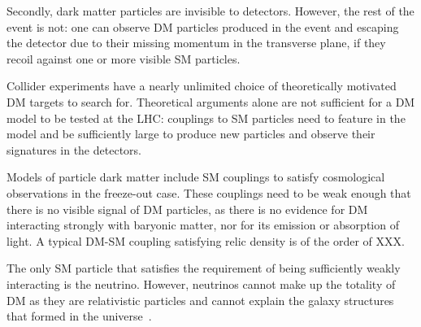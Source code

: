 
Secondly, dark matter particles are invisible to detectors. 
However, the rest of the event is not: one can observe DM particles
produced in the event and escaping the detector 
due to their missing momentum in the transverse plane, if they recoil against one or 
more visible SM particles. 



Collider experiments have a nearly unlimited choice of theoretically
motivated DM targets to search for. 
Theoretical arguments alone are not sufficient for a DM model to be tested at the LHC: 
couplings to SM particles need to feature in the model and be sufficiently large
to produce new particles and observe their signatures in the detectors. 


Models of particle dark matter include SM couplings to satisfy cosmological observations in the freeze-out case. These couplings need to be weak enough that there is no visible signal of DM particles, as there is no evidence for DM interacting strongly with baryonic matter, nor for its emission or absorption of light. A typical DM-SM coupling satisfying relic density is of the order of XXX. %

The only SM particle that satisfies the requirement of being sufficiently weakly interacting is the neutrino. However, neutrinos cannot make up the totality of DM as they 
are relativistic particles and cannot explain the galaxy structures that formed in the universe~\cite{PlehnLecturesDM}. %

